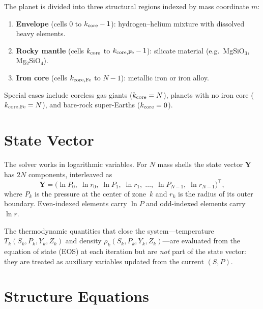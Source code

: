 \documentclass{aastex631}
\begin{document}
The planet is divided into three structural regions indexed by mass
coordinate $m$:
\begin{enumerate}
  \item \textbf{Envelope} (cells $0$ to $k_{\rm core}-1$): hydrogen--helium
    mixture with dissolved heavy elements.
  \item \textbf{Rocky mantle} (cells $k_{\rm core}$ to $k_{\rm core,Fe}-1$):
    silicate material (e.g.\ MgSiO$_3$, Mg$_2$SiO$_4$).
  \item \textbf{Iron core} (cells $k_{\rm core,Fe}$ to $N-1$): metallic
    iron or iron alloy.
\end{enumerate}
Special cases include coreless gas giants ($k_{\rm core}=N$), planets
with no iron core ($k_{\rm core,Fe}=N$), and bare-rock super-Earths
($k_{\rm core}=0$).

\section{State Vector}\label{sec:state}

The solver works in logarithmic variables.  For $N$ mass shells the
state vector $\mathbf{Y}$ has $2N$ components, interleaved as
\begin{equation}\label{eq:statevec}
  \mathbf{Y}
  = \bigl(\ln P_0,\;\ln r_0,\;\ln P_1,\;\ln r_1,\;\ldots,\;
          \ln P_{N-1},\;\ln r_{N-1}\bigr)^{\!\top}\!,
\end{equation}
where $P_k$ is the pressure at the center of zone~$k$ and $r_k$ is the
radius of its outer boundary.  Even-indexed elements carry
$\ln P$ and odd-indexed elements carry $\ln r$.

The thermodynamic quantities that close the system---temperature
$T_k(S_k, P_k, Y_k, Z_k)$ and density $\rho_k(S_k, P_k, Y_k,
Z_k)$---are evaluated from the equation of state (EOS) at each
iteration but are \emph{not} part of the state vector: they are treated
as auxiliary variables updated from the current $(S, P)$.

\section{Structure Equations}\label{sec:equations}
\end{document}
